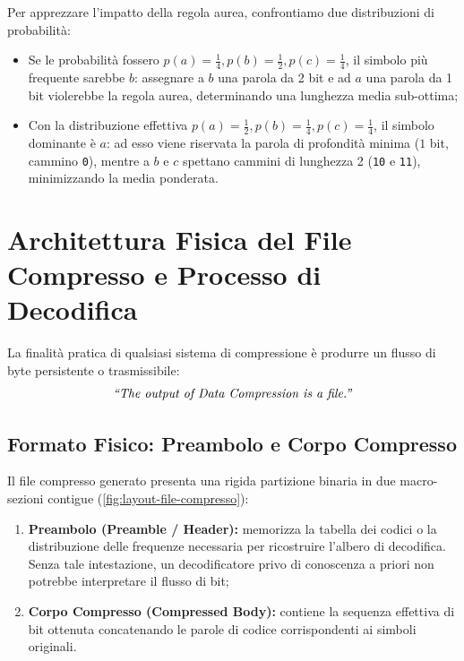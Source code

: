 Per apprezzare l'impatto della regola aurea, confrontiamo due distribuzioni di probabilit\`a:
\begin{itemize}
  \item Se le probabilit\`a fossero $p(a) = \frac{1}{4}, p(b) = \frac{1}{2}, p(c) = \frac{1}{4}$, il simbolo pi\`u frequente sarebbe $b$: assegnare a $b$ una parola da 2 bit e ad $a$ una parola da 1 bit violerebbe la regola aurea, determinando una lunghezza media sub-ottima;
  \item Con la distribuzione effettiva $p(a) = \frac{1}{2}, p(b) = \frac{1}{4}, p(c) = \frac{1}{4}$, il simbolo dominante \`e $a$: ad esso viene riservata la parola di profondit\`a minima ($1$ bit, cammino \texttt{0}), mentre a $b$ e $c$ spettano cammini di lunghezza 2 (\texttt{10} e \texttt{11}), minimizzando la media ponderata.
\end{itemize}

\FloatBarrier
\section{Architettura Fisica del File Compresso e Processo di Decodifica}
\label{sec:architettura-file-compresso}

La finalit\`a pratica di qualsiasi sistema di compressione \`e produrre un flusso di byte persistente o trasmissibile:
\begin{equation}
  \text{\textit{``The output of Data Compression is a file.''}}
\end{equation}

\FloatBarrier
\subsection{Formato Fisico: Preambolo e Corpo Compresso}
\label{subsec:formato-fisico-file}

Il file compresso generato presenta una rigida partizione binaria in due macro-sezioni contigue (\autoref{fig:layout-file-compresso}):
\begin{enumerate}
  \item \textbf{Preambolo (Preamble / Header):} memorizza la tabella dei codici o la distribuzione delle frequenze necessaria per ricostruire l'albero di decodifica. Senza tale intestazione, un decodificatore privo di conoscenza a priori non potrebbe interpretare il flusso di bit;
  \item \textbf{Corpo Compresso (Compressed Body):} contiene la sequenza effettiva di bit ottenuta concatenando le parole di codice corrispondenti ai simboli originali.
\end{enumerate}

